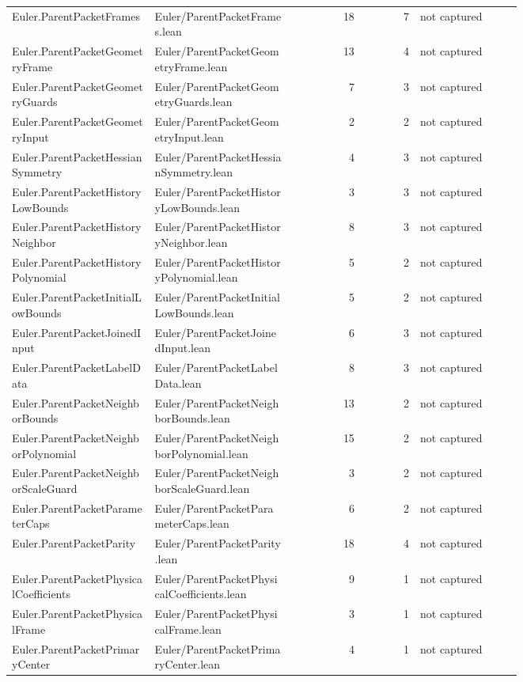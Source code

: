 \documentclass[10pt]{article}
\begin{document}
\begin{longtable}{p{0.28\linewidth}p{0.27\linewidth}r r p{0.20\linewidth}}
Euler.ParentPacketFrames & Euler/ParentPacketFrames.lean & 18 & 7 & not captured\\
Euler.ParentPacketGeometryFrame & Euler/ParentPacketGeometryFrame.lean & 13 & 4 & not captured\\
Euler.ParentPacketGeometryGuards & Euler/ParentPacketGeometryGuards.lean & 7 & 3 & not captured\\
Euler.ParentPacketGeometryInput & Euler/ParentPacketGeometryInput.lean & 2 & 2 & not captured\\
Euler.ParentPacketHessianSymmetry & Euler/ParentPacketHessianSymmetry.lean & 4 & 3 & not captured\\
Euler.ParentPacketHistoryLowBounds & Euler/ParentPacketHistoryLowBounds.lean & 3 & 3 & not captured\\
Euler.ParentPacketHistoryNeighbor & Euler/ParentPacketHistoryNeighbor.lean & 8 & 3 & not captured\\
Euler.ParentPacketHistoryPolynomial & Euler/ParentPacketHistoryPolynomial.lean & 5 & 2 & not captured\\
Euler.ParentPacketInitialLowBounds & Euler/ParentPacketInitialLowBounds.lean & 5 & 2 & not captured\\
Euler.ParentPacketJoinedInput & Euler/ParentPacketJoinedInput.lean & 6 & 3 & not captured\\
Euler.ParentPacketLabelData & Euler/ParentPacketLabelData.lean & 8 & 3 & not captured\\
Euler.ParentPacketNeighborBounds & Euler/ParentPacketNeighborBounds.lean & 13 & 2 & not captured\\
Euler.ParentPacketNeighborPolynomial & Euler/ParentPacketNeighborPolynomial.lean & 15 & 2 & not captured\\
Euler.ParentPacketNeighborScaleGuard & Euler/ParentPacketNeighborScaleGuard.lean & 3 & 2 & not captured\\
Euler.ParentPacketParameterCaps & Euler/ParentPacketParameterCaps.lean & 6 & 2 & not captured\\
Euler.ParentPacketParity & Euler/ParentPacketParity.lean & 18 & 4 & not captured\\
Euler.ParentPacketPhysicalCoefficients & Euler/ParentPacketPhysicalCoefficients.lean & 9 & 1 & not captured\\
Euler.ParentPacketPhysicalFrame & Euler/ParentPacketPhysicalFrame.lean & 3 & 1 & not captured\\
Euler.ParentPacketPrimaryCenter & Euler/ParentPacketPrimaryCenter.lean & 4 & 1 & not captured\\

\end{longtable}
\end{document}
